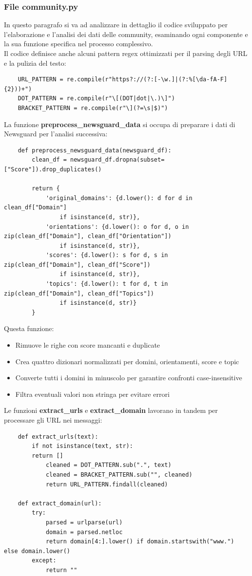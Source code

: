 \documentclass[12pt]{article}
\begin{document}
	\subsubsection{File community.py}
	In questo paragrafo si va ad analizzare in dettaglio il codice sviluppato per l'elaborazione e l'analisi dei dati delle community, esaminando ogni componente e la sua funzione specifica nel processo complessivo.\\
	Il codice definisce anche alcuni pattern regex ottimizzati per il parsing degli URL e la pulizia del testo:
	\begin{lstlisting}
	URL_PATTERN = re.compile(r"https?://(?:[-\w.]|(?:%[\da-fA-F]{2}))+")
	DOT_PATTERN = re.compile(r"\[(DOT|dot|\.)\]")
	BRACKET_PATTERN = re.compile(r"\](?=\s|$)")
	\end{lstlisting}
	La funzione \textbf{preprocess\_newsguard\_data} si occupa di preparare i dati di Newsguard per l'analisi successiva:
	\begin{lstlisting}
	def preprocess_newsguard_data(newsguard_df):
		clean_df = newsguard_df.dropna(subset=["Score"]).drop_duplicates()
		
		return {
			'original_domains': {d.lower(): d for d in clean_df["Domain"] 
				if isinstance(d, str)},
			'orientations': {d.lower(): o for d, o in zip(clean_df["Domain"], clean_df["Orientation"]) 
				if isinstance(d, str)},
			'scores': {d.lower(): s for d, s in zip(clean_df["Domain"], clean_df["Score"])
				if isinstance(d, str)},
			'topics': {d.lower(): t for d, t in zip(clean_df["Domain"], clean_df["Topics"]) 
				if isinstance(d, str)}
		}
	\end{lstlisting}
	Questa funzione:
	\begin{itemize}[label=]
		\item Rimuove le righe con score mancanti e duplicate
		\item Crea quattro dizionari normalizzati per domini, orientamenti, score e topic
		\item Converte tutti i domini in minuscolo per garantire confronti case-insensitive
		\item Filtra eventuali valori non stringa per evitare errori
	\end{itemize}
	Le funzioni \textbf{extract\_urls} e \textbf{extract\_domain} lavorano in tandem per processare gli URL nei messaggi:
	\begin{lstlisting}
	def extract_urls(text):
		if not isinstance(text, str):
		return []
			cleaned = DOT_PATTERN.sub(".", text)
			cleaned = BRACKET_PATTERN.sub("", cleaned)
			return URL_PATTERN.findall(cleaned)
		
	def extract_domain(url):
		try:
			parsed = urlparse(url)
			domain = parsed.netloc
			return domain[4:].lower() if domain.startswith("www.") else domain.lower()
		except:
			return ""
	\end{lstlisting}
\end{document}
